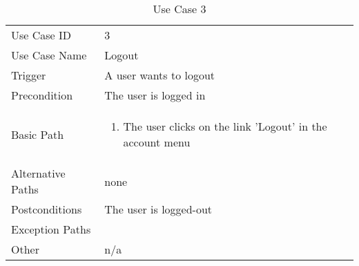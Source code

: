 \begin{table}[H]
\centering
\label{table-use-case-3}
\begin{tabular}{|p{3cm}|p{10cm}}
Use Case ID       & 3                                                                                                                                                              \\
Use Case Name     & Logout                                                                                                                                                         \\
Trigger           & A user wants to logout                                                                                                                   \\
Precondition      & The user is logged in                                                                                                        \\
Basic Path        & \begin{enumerate}
\item The user clicks on the link 'Logout' in the account menu
\end{enumerate} 
     \\
Alternative Paths & none                         \\
Postconditions    & The user is logged-out                                                                                                                                          \\
Exception Paths   &         \\
Other             & n/a                                                                                                                                                                                                        
\end{tabular}
\caption{Use Case 3}
\end{table}


